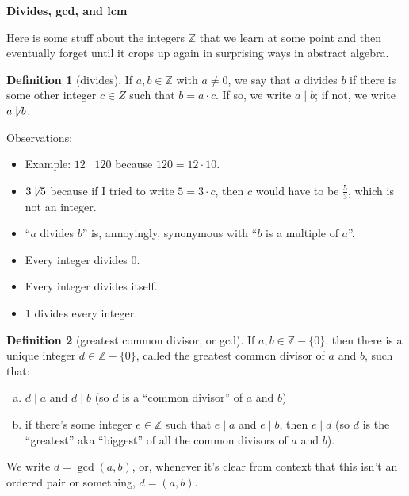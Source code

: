 \documentclass[12pt]{article}
\theoremstyle{definition} %
\newtheorem*{definition}{Definition}
\newcommand{\Alert}[1]{\textcolor{xRed}{#1}}
\newcommand{\Z}{\mathbb{Z}}
\newcommand{\Zstar}{\mathbb{Z} - \{0\}}
\renewcommand{\section}[1]{\begin{center} \textbf{#1} \\\end{center}}
\begin{document}
\section{Divides, gcd, and lcm}

Here is some stuff about the integers $\Z$ that we learn at some point and then eventually forget until it crops up again in surprising ways in abstract algebra.

\begin{definition}[divides]
    If $a, b\in \Z$ with $a \neq 0$, we say that $a$ \Alert{divides} $b$ if there is some other integer $c\in Z$ such that $b = a\cdot c$. If so, we write $a \mid b$; if not, we write $a \not\mid b$.
\end{definition}

Observations:

\begin{itemize}
    \item Example: $12 \mid 120$ because $120 = 12 \cdot 10$.
    \item $3 \not\mid 5$ because if I tried to write $5 = 3\cdot c$, then $c$ would have to be $\frac53$, which is not an integer.
    \item ``$a$ divides $b$'' is, annoyingly, synonymous with ``$b$ is a multiple of $a$''.
    \item Every integer divides 0.
    \item Every integer divides itself.
    \item 1 divides every integer.
\end{itemize}

\hrulefill

\begin{definition}[greatest common divisor, or gcd]
    If $a, b \in \Zstar$, then there is a unique integer $d\in\Zstar$, called the \Alert{greatest common divisor} of $a$ and $b$, such that:
    \begin{enumerate}[(a)]
        \item $d\mid a$ and $d\mid b$ (so $d$ is a ``common divisor'' of $a$ and $b$)
        \item if there's some integer $e\in \Z$ such that $e\mid a$ and $e \mid b$, then $e\mid d$ (so $d$ is the ``greatest'' aka ``biggest'' of all the common divisors of $a$ and $b$).
    \end{enumerate}
    We write $d = \gcd(a, b)$, or, whenever it's clear from context that this isn't an ordered pair or something, $d = (a, b)$.
\end{definition}
\end{document}

